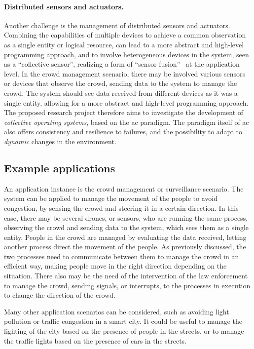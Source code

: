 \documentclass[12pt, a4paper]{article}
\begin{document}
\paragraph{Distributed sensors and actuators.}
Another challenge is the management of distributed sensors and actuators.
%
Combining the capabilities of multiple devices to achieve a common observation as a single entity or logical resource,
can lead to a more abstract and high-level programming approach,
and to involve heterogeneous devices in the system,
seen as a ``collective sensor'',
realizing a form of ``sensor fusion''~\cite{sasiadek2002sensor} at the application level.
%
In the crowd management scenario,
there may be involved various sensors or devices that observe the crowd,
sending data to the system to manage the crowd.
%
The system should see data received from different devices as it was a single entity,
allowing for a more abstract and high-level programming approach.
\\

The proposed research project therefore aims to investigate the development of \emph{collective operating systems},
based on the \ac{ac} paradigm.
%
The paradigm itself of \ac{ac} also offers consistency and resilience to failures,
and the possibility to adapt to \emph{dynamic} changes in the environment.

\subsection{Example applications}
\label{subsec:example-applications}
An application instance is the crowd management or surveillance scenario.
%
The system can be applied to manage the movement of the people to avoid congestion,
by sensing the crowd and steering it in a certain direction.
%
In this case,
there may be several drones, or sensors, who are running the same process,
observing the crowd and sending data to the system,
which sees them as a single entity.
%
People in the crowd are managed by evaluating the data received,
letting another process direct the movement of the people.
%
As previously discussed,
the two processes need to communicate between them to manage the crowd in an efficient way,
making people move in the right direction depending on the situation.
%
There also may be the need of the intervention of the law enforcement to manage the crowd,
sending signals, or interrupts,
to the processes in execution to change the direction of the crowd.

Many other application scenarios can be considered,
such as avoiding light pollution or traffic congestion in a smart city.
%
It could be useful to manage the lighting of the city based on the presence of people in the streets,
or to manage the traffic lights based on the presence of cars in the streets.
\end{document}
